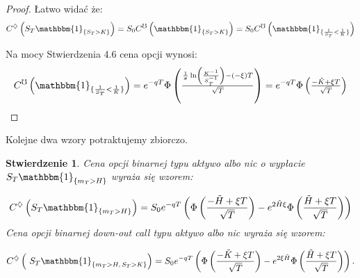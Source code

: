 \documentclass[11pt]{report}
\newtheorem{stw}{Stwierdzenie}[chapter]
\newcommand*{\Scale}[2][4]{\scalebox{#1}{$#2$}}%
\begin{document}
\begin{proof}
Łatwo widać że:
 \begin{equation*} C^{\diamondsuit}\left( S_T \mathbbm{1}_{ \{ S_T>K \} } \right) = S_0 C^{\mho}\left(\mathbbm{1}_{ \{ S_T>K \} }\right) = S_0 C^{\mho}\left(\mathbbm{1}_{ \{ \frac{1}{S_T}<\frac{1}{K} \} }\right)
 \end{equation*} 

 Na mocy Stwierdzenia 4.6 cena opcji wynosi:
\begin{multline*} 
C^{\mho}\left(\mathbbm{1}_{ \{ \frac{1}{S_T}<\frac{1}{K} \} }\right) = e^{-qT}\Scale[1.0]{\Phi \left(\frac{ \frac{1}{\sigma}\ln \left({\frac{K^{-1}}{S_T^{-1}}} \right)-(-\xi)T  }{\sqrt{T}}\right)} = e^{-qT} \Scale[1.0]{  \Phi \left(\frac{ -\tilde{K}+\xi T }{\sqrt{T}}\right) } 
\end{multline*}


\end{proof}
Kolejne dwa wzory potraktujemy zbiorczo.
\begin{stw}
Cena opcji binarnej typu aktywo albo nic o wypłacie $S_T \mathbbm{1}_{\{ m_T > H \}}$ wyraża się wzorem:

\begin{equation*}
C^{\diamondsuit}\left(S_T \mathbbm{1}_{ \{ m_T>H \} } \right) = S_0 e^{-qT}\left(\Phi \left(\frac{ -\tilde{H}+\xi T }{\sqrt{T}}\right) - e^{2\tilde{H}\xi}\Phi\left(\frac{ \tilde{H}+\xi T }{\sqrt{T}} \right)\right)
\end{equation*}
$ $ \\
Cena opcji binarnej down-out call typu aktywo albo nic wyraża się wzorem:

\begin{equation*}
 C^{\diamondsuit}\left( \ S_T\mathbbm{1}_{ \{ m_T > H, \,  S_T > K \} } \right) = S_0 e^{-qT}\left(\Phi \left(\frac{ -\tilde{K}+\xi T }{\sqrt{T}}\right) - e^{2 \xi \tilde{H}}\Phi\left(\frac{ \tilde{H}+\xi T }{\sqrt{T}}\right) \right). 
\end{equation*}
\end{stw}
\end{document}
